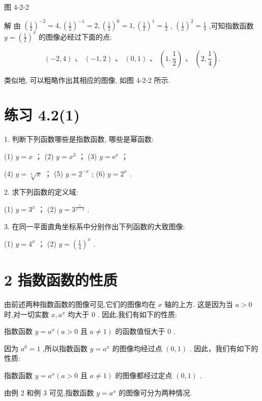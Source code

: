 \documentclass[10pt]{article}
\begin{document}
图 4-2-2

解 由 \({\left( \frac{1}{2}\right) }^{-2} = 4,{\left( \frac{1}{2}\right) }^{-1} = 2,{\left( \frac{1}{2}\right) }^{0} = 1,{\left( \frac{1}{2}\right) }^{1} = \frac{1}{2}\) , \({\left( \frac{1}{2}\right) }^{2} = \frac{1}{4}\) ,可知指数函数 \(y = {\left( \frac{1}{2}\right) }^{x}\) 的图像必经过下面的点:

\[
\left( {-2,4}\right) \text{ 、 }\left( {-1,2}\right) \text{ 、 }\left( {0,1}\right) \text{ 、 }\left( {1,\frac{1}{2}}\right) \text{ 、 }\left( {2,\frac{1}{4}}\right) .
\]

类似地, 可以粗略作出其相应的图像, 如图 4-2-2 所示.

\section*{练习 4.2(1)}

1. 判断下列函数哪些是指数函数, 哪些是幂函数:

(1) \(y = x\) ； (2) \(y = {x}^{3}\) ； (3) \(y = {\mathrm{e}}^{x}\) ；

(4) \(y = \sqrt[3]{x}\) ； (5) \(y = {2}^{-x}\) ; (6) \(y = {2}^{x}\) .

2. 求下列函数的定义域:

(1) \(y = {3}^{x}\) ； (2) \(y = {3}^{\frac{1}{x - 2}}\) .

3. 在同一平面直角坐标系中分别作出下列函数的大致图像:

(1) \(y = {4}^{x}\) ； (2) \(y = {\left( \frac{1}{4}\right) }^{x}\) .





\section*{2 指数函数的性质}

由前述两种指数函数的图像可见,它们的图像均在 \(x\) 轴的上方. 这是因为当 \(a > 0\) 时,对一切实数 \(x,{a}^{x}\) 均大于 0 . 因此,我们有如下的性质:

指数函数 \(y = {a}^{x}\left( {a > 0\text{ 且 }a \neq  1}\right)\) 的函数值恒大于 0 .

因为 \({a}^{0} = 1\) ,所以指数函数 \(y = {a}^{x}\) 的图像均经过点 \(\left( {0,1}\right)\) . 因此，我们有如下的性质:

指数函数 \(y = {a}^{x}\left( {a > 0\text{ 且 }a \neq  1}\right)\) 的图像都经过定点 \(\left( {0,1}\right)\) .

由例 2 和例 3 可见,指数函数 \(y = {a}^{x}\) 的图像可分为两种情况.
\end{document}
